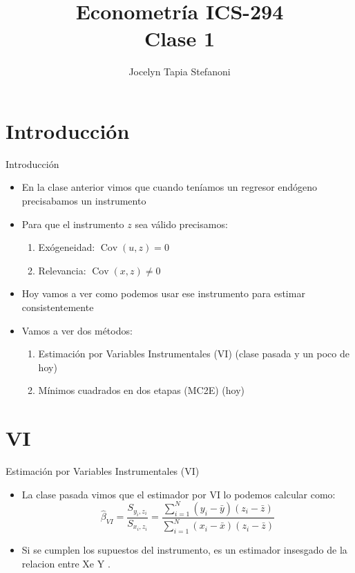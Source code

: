 \documentclass[10pt]{beamer}
\title[ICS-162]{Econometría ICS-294\\ \small{Clase 1}}
\author{Jocelyn Tapia Stefanoni}
\institute[USM]
{Universidad Técnica Federico Santa María\\ %
	\medskip
	\textit{} %
	
}
\date{}
\begin{document}
	
\begin{frame}
	\titlepage %
\end{frame}

\section{Introducción}

\begin{frame}{Introducción}
    \begin{itemize}
        \item  En la clase anterior vimos que cuando teníamos un regresor endógeno precisabamos un instrumento
        \item Para que el instrumento $z$ sea válido precisamos:
        \begin{enumerate}
            \item Exógeneidad: $\operatorname{Cov}(u, z)=0$
            \item Relevancia: $\operatorname{Cov}(x, z) \neq 0$
        \end{enumerate}
        \item Hoy vamos a ver como podemos usar ese instrumento para estimar consistentemente
        \item Vamos a ver dos métodos:
        \begin{enumerate}
            \item Estimación por Variables Instrumentales (VI) (clase pasada y un poco de hoy)
            \item Mínimos cuadrados en dos etapas (MC2E) (hoy)
        \end{enumerate}
    \end{itemize}
\end{frame}

\section{VI}

\begin{frame}{Estimación por Variables Instrumentales (VI)}
    \begin{itemize}
        \item La clase pasada vimos que el estimador por VI lo podemos calcular como:
        $$
        \hat{\beta}_{V I}=\frac{S_{y_{i}, z_{i}}}{S_{x_{i}, z_{i}}}=\frac{\sum_{i=1}^{N}\left(y_{i}-\bar{y}\right)\left(z_{i}-\bar{z}\right)}{\sum_{i=1}^{N}\left(x_{i}-\bar{x}\right)\left(z_{i}-\bar{z}\right)}
        $$
        \item Si se cumplen los supuestos del instrumento, es un estimador insesgado de la relacion entre Xe Y .
    \end{itemize}
\end{frame}
\end{document}

